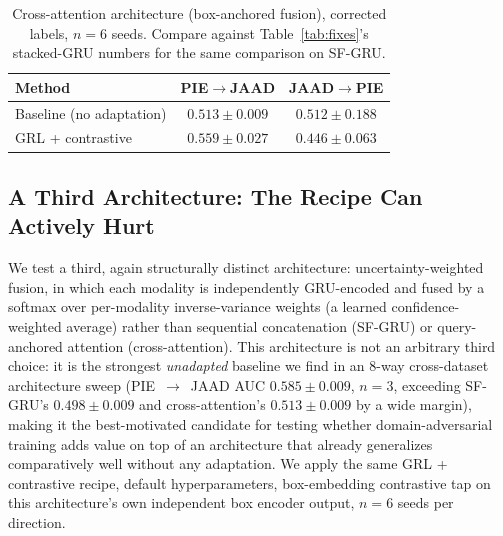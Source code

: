 \begin{table}[t]
\centering
\caption{Cross-attention architecture (box-anchored fusion), corrected
labels, $n=6$ seeds. Compare against Table~\ref{tab:fixes}'s
stacked-GRU numbers for the same comparison on SF-GRU.}
\label{tab:crossattn}
\begin{tabular}{lcc}
\toprule
Method & PIE$\to$JAAD & JAAD$\to$PIE \\
\midrule
Baseline (no adaptation) & $0.513\pm0.009$ & $0.512\pm0.188$ \\
GRL + contrastive & $0.559\pm0.027$ & $0.446\pm0.063$ \\
\bottomrule
\end{tabular}
\end{table}

\subsection{A Third Architecture: The Recipe Can Actively Hurt}
\label{sec:results-uncertainty}

We test a third, again structurally distinct architecture:
uncertainty-weighted fusion, in which each modality is independently
GRU-encoded and fused by a softmax over per-modality inverse-variance
weights (a learned confidence-weighted average) rather than sequential
concatenation (SF-GRU) or query-anchored attention (cross-attention).
This architecture is not an arbitrary third choice: it is the
strongest \emph{unadapted} baseline we find in an 8-way cross-dataset
architecture sweep (PIE~$\to$~JAAD AUC $0.585\pm0.009$, $n=3$,
exceeding SF-GRU's $0.498\pm0.009$ and cross-attention's
$0.513\pm0.009$ by a wide margin), making it the best-motivated
candidate for testing whether domain-adversarial training adds value
on top of an architecture that already generalizes comparatively well
without any adaptation. We apply the same GRL + contrastive recipe,
default hyperparameters, box-embedding contrastive tap on this
architecture's own independent box encoder output, $n=6$ seeds per
direction.

